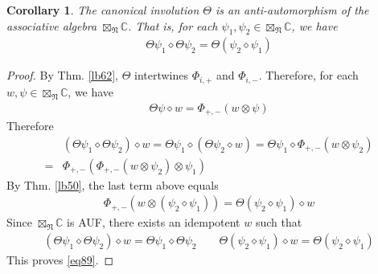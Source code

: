 \documentclass[11pt,b5paper,notitlepage]{article}
\theoremstyle{definition}
\theoremstyle{plain}
\newtheorem{co}[df]{Corollary}
\newcommand{\Hom}{\mathrm{Hom}}
\newcommand{\Vbb}{\mathbb V}
\newcommand{\Wbb}{\mathbb W}
\newcommand{\Cbb}{\mathbb C}
\newcommand{\<}{\left\langle}
\renewcommand{\>}{\right\rangle}
\newcommand{\Mod}{\mathrm{Mod}}
\newcommand{\fn}{\mathfrak{N}}
\numberwithin{equation}{section}
\begin{document}
\begin{comment}
\begin{co}
Let $\Wbb_1,\Wbb_2\in \Mod(\Vbb^{\otimes 2})$ and $T:\Wbb_1\rightarrow \Wbb_2$ be a linear map. Then $T\in \Hom_{\Vbb^{\otimes 2}}(\Wbb_1,\Wbb_2)$ iff for each $\psi,\varphi\in \boxtimes_\fn\Cbb$ and $w\in \Wbb_1$, we have 
\begin{align}
	T(\psi\diamond_L w)=\psi\diamond_L T(w),\quad T(w\diamond_R \varphi)=T(w)\diamond_R \varphi
\end{align}
\end{co}
\begin{proof}
	
\end{proof}
\end{comment}


\begin{co}
The canonical involution $\Theta$ is an anti-automorphism of the associative algebra $\boxtimes_\fn\Cbb$. That is, for each $\psi_1,\psi_2\in\boxtimes_\fn\Cbb$, we have
\begin{align}\label{eq89}
\Theta\psi_1\diamond\Theta\psi_2=\Theta(\psi_2\diamond\psi_1)
\end{align}
\end{co}


\begin{proof}
By Thm. \ref{lb62}, $\Theta$ intertwines $\Phi_{i,+}$ and $\Phi_{i,-}$. Therefore, for each $w,\psi\in\boxtimes_\fn\Cbb$, we have
\begin{align*}
\Theta\psi\diamond w=\Phi_{+,-}(w\otimes\psi)
\end{align*}
Therefore
\begin{align*}
&(\Theta\psi_1\diamond\Theta\psi_2)\diamond w=\Theta\psi_1\diamond(\Theta\psi_2\diamond w)=\Theta\psi_1\diamond\Phi_{+,-}(w\otimes\psi_2)\\
=&\Phi_{+,-}(\Phi_{+,-}(w\otimes\psi_2)\otimes\psi_1)
\end{align*}
By Thm. \ref{lb50}, the last term above equals
\begin{align*}
\Phi_{+,-} (w\otimes(\psi_2\diamond\psi_1))=\Theta(\psi_2\diamond\psi_1)
\diamond w
\end{align*}
Since $\boxtimes_\fn\Cbb$ is AUF, there exists an idempotent $w$ such that
\begin{align*}
(\Theta\psi_1\diamond\Theta\psi_2)\diamond w=\Theta\psi_1\diamond\Theta\psi_2\qquad \Theta(\psi_2\diamond\psi_1)
\diamond w=\Theta(\psi_2\diamond\psi_1)
\end{align*}
This proves \eqref{eq89}. 
\end{proof}
\end{document}
